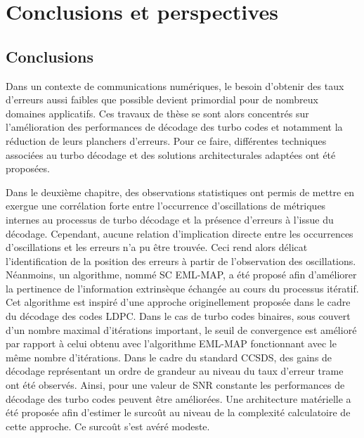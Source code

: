 \chapter*{Conclusions et perspectives}
\section*{Conclusions}
Dans un contexte de communications numériques,
le besoin d'obtenir des taux d'erreurs aussi faibles que possible devient primordial pour de nombreux domaines 
applicatifs. Ces travaux de thèse se sont alors concentrés sur l'amélioration des performances de décodage des turbo 
codes et notamment la réduction de leurs planchers d'erreurs. Pour ce faire, différentes techniques associées au turbo 
décodage et des solutions architecturales adaptées ont été proposées.


Dans le deuxième chapitre, des observations statistiques ont permis de mettre en exergue une corrélation forte entre 
l’occurrence d'oscillations de métriques internes au processus de turbo décodage et la présence d'erreurs à l'issue du
décodage. Cependant, aucune relation d'implication directe entre les occurrences d'oscillations et les erreurs n'a pu
être trouvée. Ceci rend alors délicat l'identification de la position des erreurs à partir de l'observation
des oscillations. Néanmoins, un algorithme, nommé SC EML-MAP, a été proposé afin d'améliorer la pertinence de l'information extrinsèque 
échangée au cours du processus itératif. Cet algorithme est inspiré d'une approche originellement proposée 
dans le cadre du décodage des codes LDPC. Dans le cas de turbo codes binaires, sous couvert d'un nombre maximal d'itérations
important, le seuil de convergence est amélioré par rapport à celui obtenu avec 
l'algorithme EML-MAP fonctionnant avec le même nombre 
d'itérations. Dans le cadre du standard CCSDS, des gains de décodage représentant un ordre de grandeur au niveau du taux 
d'erreur trame ont été observés. Ainsi, pour une valeur de SNR constante les performances de décodage des turbo codes
peuvent être améliorées. Une architecture matérielle a été proposée afin d'estimer le surcoût au niveau de la 
complexité calculatoire de cette approche. Ce surcoût s'est avéré modeste.

